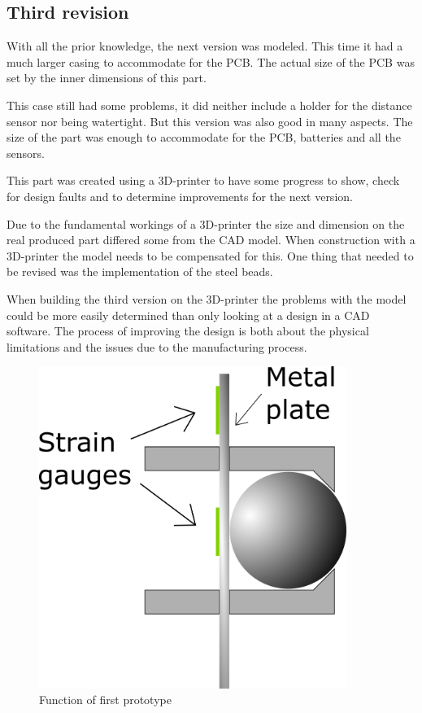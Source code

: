 \subsection{Third revision}
With all the prior knowledge, the next version was modeled. This time it had a much larger casing to accommodate for the PCB. The actual size of the PCB was set by the inner dimensions of this part.  

This case still had some problems, it did neither include a holder for the distance sensor nor being watertight. But this version was also good in many aspects. The size of the part was enough to accommodate for the PCB, batteries and all the sensors.  

This part was created using a 3D-printer to have some progress to show, check for design faults and to determine improvements for the next version.  

Due to the fundamental workings of a 3D-printer the size and dimension on the real produced part differed some from the CAD model. When construction with a 3D-printer the model needs to be compensated for this. One thing that needed to be revised was the implementation of the steel beads.  

When building the third version on the 3D-printer the problems with the model could be more easily determined than only looking at a design in a CAD software. The process of improving the design is both about the physical limitations and the issues  due to the manufacturing process. 


\begin{figure}[H]
\begin{center}
	\includegraphics[width = 10cm]{Figures/Press_sens_func_1.png}
	\caption{Function of first prototype}
	\label{Press_sens_prot_1}
\end{center}
\end{figure}

